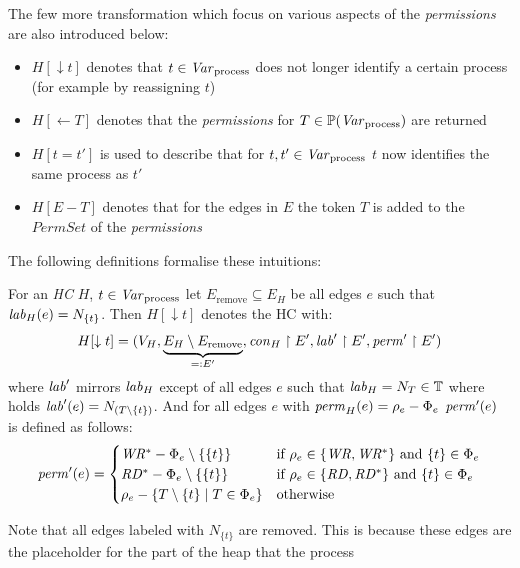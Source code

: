 	The few more transformation which focus on various aspects of the
	\emph{permissions} are also introduced below:
	\begin{itemize}
		\item $H[\downarrow t]$ denotes that $t\in\mathit{Var}_{\text{process}}$
			does not longer identify a certain process (for example by reassigning
			$t$)
		\item $H[\leftarrow T]$ denotes that the \emph{permissions} for
			$T\in\mathbb{P}(\mathit{Var}_{\text{process}})$ are returned
		\item $H[t = t']$ is used to describe that for
			$t,t'\in\mathit{Var}_{\text{process}}$ $t$ now identifies the same
			process as $t'$
		\item $H[E - T]$ denotes that for the edges in $E$ the token $T$ is added
			to the $\mathit{PermSet}$ of the \emph{permissions}
	\end{itemize}
	The following definitions formalise these intuitions:
	\begin{definition}
		For an \emph{\ac{HC}} $H$, $t\in\mathit{Var}_{\text{process}}$ let
		$E_{\text{remove}}\subseteq E_{H}$ be all edges $e$ such that
		$\mathit{lab}_{H}(e) = N_{\{t\}}$. Then $H[{\downarrow{t}}]$ denotes the \ac{HC}
		with:
		\begin{equation*}
			H[{\downarrow{t}}]= (V_{H},
			\underbrace{E_{H}\setminus E_{\text{remove}}}_{=: E'},
			\mathit{con}_{H} \upharpoonright E',
			\mathit{lab}' \upharpoonright E', \mathit{perm}'
			\upharpoonright E')
		\end{equation*}
		where $\mathit{lab}'$ mirrors $\mathit{lab}_{H}$ except of all edges $e$ such that
		$\mathit{lab}_{H} = N_{T}\in\mathbb{T}$ where holds
		$\mathit{lab}'(e) = N_{(T\setminus \{t\})}$. And for all edges $e$ with
		$\mathit{perm}_{H}(e) = \rho_{e} - \Phi_{e}$ $\mathit{perm}'(e)$ is defined as follows:
		\begin{equation*}
			\mathit{perm}'(e) =
			\begin{cases}
				\mathit{WR^\ast} - \Phi_{e}\setminus\{\{t\}\}&\text{if }
				\rho_{e}\in\{\mathit{WR},\mathit{WR^\ast}\} \text{ and }
				\{t\}\in\Phi_{e}\\
				\mathit{RD^\ast} - \Phi_{e}\setminus\{\{t\}\}&\text{if }
				\rho_{e}\in\{\mathit{RD},\mathit{RD^\ast}\} \text{ and }
				\{t\}\in\Phi_{e}\\
				\rho_{e} - \{T\setminus\{t\}\mid T\in\Phi_{e}\} &\text{otherwise}
			\end{cases}
		\end{equation*}
	\end{definition}
	Note that all edges labeled with $N_{\{t\}}$ are removed. This is because
	these edges are the placeholder for the part of the heap that the process
